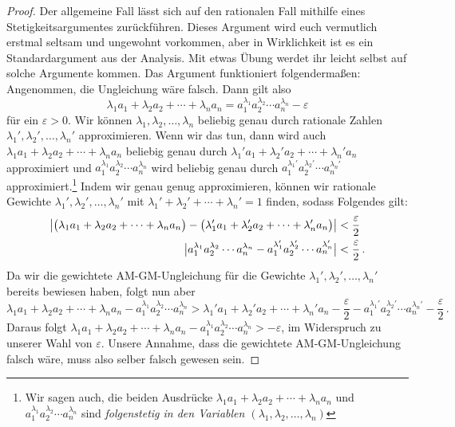 \begin{proof}
	Der allgemeine Fall lässt sich auf den rationalen Fall mithilfe eines Stetigkeitsargumentes zurückführen. Dieses Argument wird euch vermutlich erstmal seltsam und ungewohnt vorkommen, aber in Wirklichkeit ist es ein Standardargument aus der Analysis. Mit etwas Übung werdet ihr leicht selbst auf solche Argumente kommen. Das Argument funktioniert folgendermaßen: Angenommen, die Ungleichung wäre falsch. Dann gilt also
	\begin{equation*}
		\lambda_1 a_1+\lambda_2 a_2+\dotsb+\lambda_na_n=a_1^{\lambda_1}a_2^{\lambda_2}\dotsm a_n^{\lambda_n}-\varepsilon
	\end{equation*}
	für ein $\varepsilon>0$. Wir können $\lambda_1,\lambda_2,\dotsc,\lambda_n$ beliebig genau durch rationale Zahlen $\lambda_1',\lambda_2',\dotsc,\lambda_n'$ approximieren. Wenn wir das tun, dann wird auch $\lambda_1 a_1+\lambda_2 a_2+\dotsb+\lambda_na_n$ beliebig genau durch $\lambda_1' a_1+\lambda_2' a_2+\dotsb+\lambda_n'a_n$ approximiert und $a_1^{\lambda_1}a_2^{\lambda_2}\dotsm a_n^{\lambda_n}$  wird beliebig genau durch $a_1^{\lambda_1'}a_2^{\lambda_2'}\dotsm a_n^{\lambda_n'}$ approximiert.\footnote{Wir sagen auch, die beiden Ausdrücke $\lambda_1 a_1+\lambda_2 a_2+\dotsb+\lambda_na_n$ und $a_1^{\lambda_1}a_2^{\lambda_2}\dotsm a_n^{\lambda_n}$ sind \emph{folgenstetig in den Variablen $(\lambda_1,\lambda_2,\dotsc,\lambda_n)$}} Indem wir genau genug approximieren, können wir rationale Gewichte $\lambda_1',\lambda_2',\dotsc,\lambda_n'$ mit $\lambda_1'+\lambda_2'+\dotsb+\lambda_n'=1$ finden, sodass Folgendes gilt:
	\begin{align*}
		\abs[\big]{\parens[\big]{\lambda_1 a_1+\lambda_2 a_2+\dotsb+\lambda_na_n}-\parens[\big]{\lambda_1' a_1+\lambda_2' a_2+\dotsb+\lambda_n'a_n}}&<\frac{\varepsilon}{2}\\
		\abs[\big]{a_1^{\lambda_1}a_2^{\lambda_2}\dotsm a_n^{\lambda_n}-a_1^{\lambda_1'}a_2^{\lambda_2'}\dotsm a_n^{\lambda_n'}}&<\frac{\varepsilon}{2}\,.
	\end{align*}
	Da wir die gewichtete AM-GM-Ungleichung für die Gewichte $\lambda_1',\lambda_2',\dotsc,\lambda_n'$ bereits bewiesen haben, folgt nun aber
	\begin{equation*}
		\lambda_1 a_1+\lambda_2 a_2+\dotsb+\lambda_na_n-a_1^{\lambda_1}a_2^{\lambda_2}\dotsm a_n^{\lambda_n}>\lambda_1' a_1+\lambda_2' a_2+\dotsb+\lambda_n'a_n-\frac{\varepsilon}{2}-a_1^{\lambda_1'}a_2^{\lambda_2'}\dotsm a_n^{\lambda_n'}-\frac{\varepsilon}{2}\,.
	\end{equation*}
	Daraus folgt $\lambda_1 a_1+\lambda_2 a_2+\dotsb+\lambda_na_n-a_1^{\lambda_1}a_2^{\lambda_2}\dotsm a_n^{\lambda_n}>-\varepsilon$, im Widerspruch zu unserer Wahl von $\varepsilon$. Unsere Annahme, dass die gewichtete AM-GM-Ungleichung falsch wäre, muss also selber falsch gewesen sein.
	

\end{proof}
